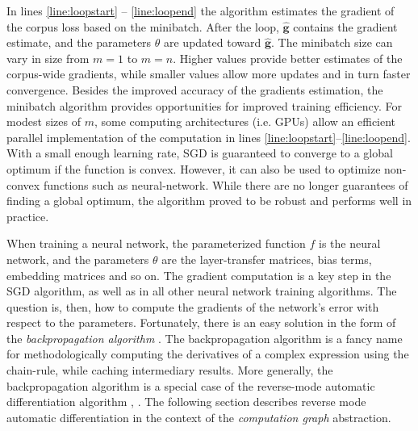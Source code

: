 \documentclass[jair,twoside,11pt,theapa]{article}
\newcommand{\m}[1]{\mathbf{#1}}%
\newcommand{\ygcomment}[1]{\textbf{[TODO: #1]}}
\renewcommand{\ygcomment}[1]{}
\begin{document}
{In lines \ref{line:loopstart} -- \ref{line:loopend} the algorithm estimates the
gradient of the corpus loss based on the minibatch.
After the loop, $\m{\hat{g}}$ contains the gradient estimate, and the parameters
$\theta$ are updated toward $\m{\hat{g}}$.
The minibatch size can vary in size from $m=1$ to $m=n$.  Higher values provide
better estimates of the corpus-wide gradients, while smaller values allow more
updates and in turn faster convergence.
Besides the improved accuracy of the gradients estimation,
the minibatch algorithm provides opportunities for improved training efficiency. For modest
sizes of $m$, some computing architectures (i.e. GPUs) allow an efficient parallel implementation
of the computation in lines \ref{line:loopstart}--\ref{line:loopend}.
With a small enough learning rate, SGD is guaranteed to converge to a global optimum
if the function is convex. However, it can also be used to optimize non-convex
functions such as neural-network. While there are no longer guarantees of finding a global optimum, the algorithm
proved to be robust and performs well in practice.
\ygcomment{``such as neural networks'': Gabi found confusing.}

When training a neural network, the parameterized function $f$ is the neural
network, and the parameters $\theta$ are the layer-transfer matrices, bias terms, embedding
matrices and so on.  The gradient computation is a key step in the SGD
algorithm, as well as in all other neural network training algorithms.
The question is, then, how to compute the gradients of the network's error with
respect to the parameters.
Fortunately, there is an easy solution in the form of the \emph{backpropagation
algorithm} \cite{rumelhart1986learning,lecun1998gradient}. The backpropagation algorithm is a fancy name for
methodologically computing the derivatives of a complex expression using the chain-rule,
while caching intermediary results.
More generally, the backpropagation algorithm is a special case of the
reverse-mode automatic differentiation algorithm \cite[Section
7]{neidinger2010introduction}, \cite{baydin2015automatic,bengio2012practical}.%
The following section
describes reverse mode automatic differentiation in the context of the
\emph{computation graph} abstraction.

}
\end{document}
